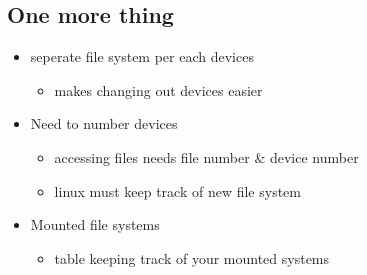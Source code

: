 \documentclass[11pt]{article}
\begin{document}
\subsection{One more thing}
\label{sec:org2a6ae83}
\begin{itemize}
\item seperate file system per each devices
\begin{itemize}
\item makes changing out devices easier
\end{itemize}
\item Need to number devices
\begin{itemize}
\item accessing files needs file number \& device number
\item linux must keep track of new file system
\end{itemize}
\item Mounted file systems
\begin{itemize}
\item table keeping track of your mounted systems
\end{itemize}
\end{itemize}
\end{document}
